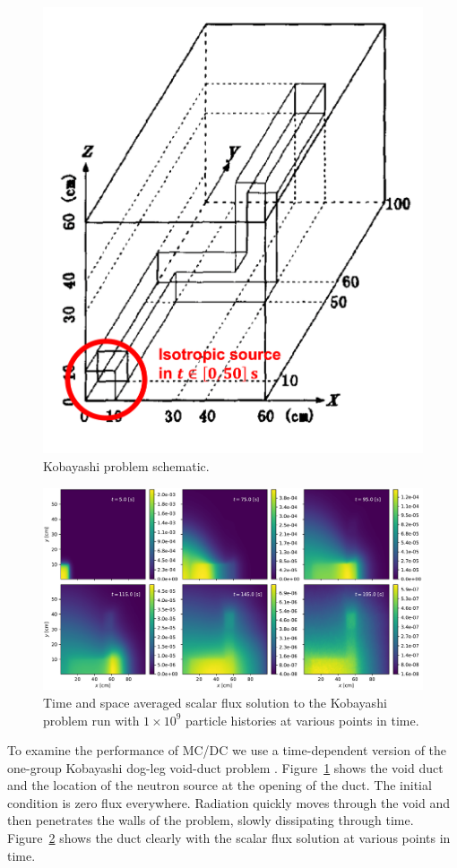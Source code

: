 \begin{figure}
    \centerline{
    \includegraphics[width=.4 \textwidth]{figures/cise_figs/kobayashi_problem.png}
    } 
    \caption{Kobayashi problem schematic.}
    \label{koby-problem-def}
\end{figure}

\begin{figure}[h]
    \centerline{
    \includegraphics[width=\textwidth]{figures/cise_figs/koby.pdf}
    } 
    \caption{Time and space averaged scalar flux solution to the Kobayashi problem run with $1\times 10^{9}$ particle histories at various points in time.}
    \label{koby-results}
\end{figure}

To examine the performance of MC/DC we use a time-dependent version of the one-group Kobayashi dog-leg void-duct problem \cite{Kobayashi2001, variansyah_mc23_mcdc}.
Figure~\ref{koby-problem-def} shows the void duct and the location of the neutron source at the opening of the duct.
The initial condition is zero flux everywhere.
Radiation quickly moves through the void and then penetrates the walls of the problem, slowly dissipating through time.
Figure~\ref{koby-results} shows the duct clearly with the scalar flux solution at various points in time.

